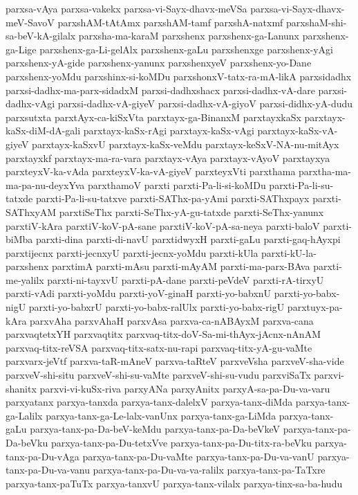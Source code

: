 {parxsa-vAya
parxsa-vakekx
parxsa-vi-Sayx-dhavx-meVSa
parxsa-vi-Sayx-dhavx-meV-SavoV
parxshAM-tAtAmx
parxshAM-tamf
parxshA-natxmf
parxshaM-shi-sa-beV-kA-gilalx
parxsha-ma-karaM
parxshenx
parxshenx-ga-Lanunx
parxshenx-ga-Lige
parxshenx-ga-Li-gelAlx
parxshenx-gaLu
parxshenxge
parxshenx-yAgi
parxshenx-yA-gide
parxshenx-yanunx
parxshenxyeV
parxshenx-yo-Dane
parxshenx-yoMdu
parxshinx-si-koMDu
parxshonxV-tatx-ra-mA-likA
parxsidadhx
parxsi-dadhx-ma-parx-sidadxM
parxsi-dadhxshacx
parxsi-dadhx-vA-dare
parxsi-dadhx-vAgi
parxsi-dadhx-vA-giyeV
parxsi-dadhx-vA-giyoV
parxsi-didhx-yA-dudu
parxsutxta
parxtAyx-ca-kiSxVta
parxtayx-ga-BinanxM
parxtayxkaSx
parxtayx-kaSx-diM-dA-gali
parxtayx-kaSx-rAgi
parxtayx-kaSx-vAgi
parxtayx-kaSx-vA-giyeV
parxtayx-kaSxvU
parxtayx-kaSx-veMdu
parxtayx-keSxV-NA-nu-mitAyx
parxtayxkf
parxtayx-ma-ra-vara
parxtayx-vAya
parxtayx-vAyoV
parxtayxya
parxteyxV-ka-vAda
parxteyxV-ka-vA-giyeV
parxteyxVti
parxthama
parxtha-ma-ma-pa-nu-deyxYva
parxthamoV
parxti
parxti-Pa-li-si-koMDu
parxti-Pa-li-su-tatxde
parxti-Pa-li-su-tatxve
parxti-SAThx-pa-yAmi
parxti-SAThxpayx
parxti-SAThxyAM
parxtiSeThx
parxti-SeThx-yA-gu-tatxde
parxti-SeThx-yanunx
parxtiV-kAra
parxtiV-koV-pA-sane
parxtiV-koV-pA-sa-neya
parxti-baloV
parxti-biMba
parxti-dina
parxti-di-navU
parxtidwyxH
parxti-gaLu
parxti-gaq-hAyxpi
parxtijecnx
parxti-jecnxyU
parxti-jecnx-yoMdu
parxti-kUla
parxti-kU-la-parxshenx
parxtimA
parxti-mAsu
parxti-mAyAM
parxti-ma-parx-BAva
parxti-me-yalilx
parxti-ni-tayxvU
parxti-pA-dane
parxti-peVdeV
parxti-rA-tirxyU
parxti-vAdi
parxti-yoMdu
parxti-yoV-ginaH
parxti-yo-babxnU
parxti-yo-babx-nigU
parxti-yo-babxrU
parxti-yo-babx-ralUlx
parxti-yo-babx-rigU
parxtuyx-pa-kAra
parxvAha
parxvAhaH
parxvAsa
parxva-ca-nABAyxM
parxva-cana
parxvaqtetxYH
parxvaqtitx
parxvaq-titx-doV-Sa-mi-thAyx-jAcnx-nAnAM
parxvaq-titx-reVSA
parxvaq-titx-satx-nu-rapi
parxvaq-titx-yA-gu-vaMte
parxvarx-jeVtf
parxva-taR-mAneV
parxva-taRteV
parxveVsha
parxveV-sha-vide
parxveV-shi-situ
parxveV-shi-su-vaMte
parxveV-shi-su-vudu
parxviSaTx
parxvi-shanitx
parxvi-vi-kuSx-riva
parxyANa
parxyAnitx
parxyA-sa-pa-Du-va-varu
parxyatanx
parxya-tanxda
parxya-tanx-dalelxV
parxya-tanx-diMda
parxya-tanx-ga-Lalilx
parxya-tanx-ga-Le-lalx-vanUnx
parxya-tanx-ga-LiMda
parxya-tanx-gaLu
parxya-tanx-pa-Da-beV-keMdu
parxya-tanx-pa-Da-beVkeV
parxya-tanx-pa-Da-beVku
parxya-tanx-pa-Du-tetxVve
parxya-tanx-pa-Du-titx-ra-beVku
parxya-tanx-pa-Du-vAga
parxya-tanx-pa-Du-vaMte
parxya-tanx-pa-Du-va-vanU
parxya-tanx-pa-Du-va-vanu
parxya-tanx-pa-Du-va-va-ralilx
parxya-tanx-pa-TaTxre
parxya-tanx-paTuTx
parxya-tanxvU
parxya-tanx-vilalx
parxya-tinx-sa-ba-hudu
}
